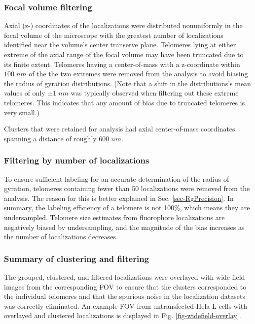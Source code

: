 \documentclass[12pt, a4paper]{article}
\begin{document}
\subsubsection{Focal volume filtering}
\label{sec-1-2-3}
\label{sec-focalVolumeFiltering}
Axial (z-) coordinates of the localizations were distributed
nonuniformly in the focal volume of the microscope with the
greatest number of localizations identified near the volume's
center transerve plane. Telomeres lying at either extreme of the
axial range of the focal volume may have been truncated due to its
finite extent. Telomeres having a center-of-mass with a
z-coordinate within $100 \; nm$ of the the two extremes were
removed from the analysis to avoid biasing the radius of gyration
distributions. (Note that a shift in the distributions's mean
values of only $\pm 1 \; nm$ was typically observed when filtering
out these extreme telomeres. This indicates that any amount of
bias due to truncated telomeres is very small.)

Clusters that were retained for analysis had axial center-of-mass
coordinates spanning a distance of roughly $600 \; nm$.

\subsubsection{Filtering by number of localizations}
\label{sec-1-2-4}
\label{sec-filter_num_loc}
To ensure sufficient labeling for an accurate determination of the
radius of gyration, telomeres containing fewer than 50
localizations were removed from the analysis. The reason for this
is better explained in Sec. \ref{sec-RgPrecision}. In summary, the
labeling efficiency of a telomere is not 100\%, which means they
are undersampled. Telomere size estimates from fluorophore
localizations are negatively biased by undersampling, and the
magnitude of the bias increases as the number of localizations
decreases.

\subsubsection{Summary of clustering and filtering}
\label{sec-1-2-5}
The grouped, clustered, and filtered localizations were overlayed
with wide field images from the corresponding FOV to ensure that
the clusters corresponded to the individual telomeres and that the
spurious noise in the localization datasets was correctly
eliminated. An example FOV from untransfected Hela L cells with
overlayed and clustered localizations is displayed in
Fig. \ref{fig-widefield-overlay}.
\end{document}
